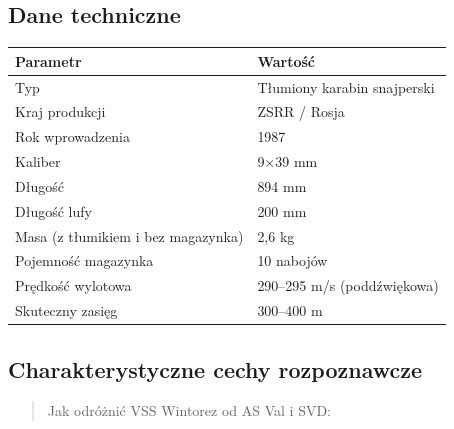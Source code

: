 \documentclass[12pt,oneside]{book}
\begin{document}
\subsection{Dane techniczne}\label{dane-techniczne-76}

\begin{longtable}[]{@{}ll@{}}
\toprule\noalign{}
Parametr & Wartość \\
\midrule\noalign{}
\endhead
\bottomrule\noalign{}
\endlastfoot
Typ & Tłumiony karabin snajperski \\
Kraj produkcji & ZSRR / Rosja \\
Rok wprowadzenia & 1987 \\
Kaliber & 9×39 mm \\
Długość & 894 mm \\
Długość lufy & 200 mm \\
Masa (z tłumikiem i bez magazynka) & 2,6 kg \\
Pojemność magazynka & 10 nabojów \\
Prędkość wylotowa & 290--295 m/s (poddźwiękowa) \\
Skuteczny zasięg & 300--400 m \\
\end{longtable}

\subsection{Charakterystyczne cechy
rozpoznawcze}\label{charakterystyczne-cechy-rozpoznawcze-76}

\begin{quote}
Jak odróżnić VSS Wintorez od AS Val i SVD:
\end{quote}
\end{document}
